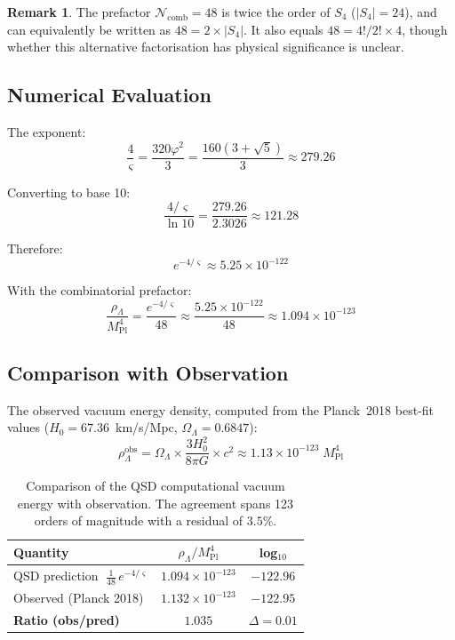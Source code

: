 \documentclass[11pt,a4paper]{article}
\theoremstyle{definition}
\newtheorem{remark}[theorem]{Remark}
\newcommand{\gs}{\varsigma}                %
\newcommand{\Mpl}{M_{\text{Pl}}}
\newcommand{\rhoL}{\rho_{\Lambda}}
\newcommand{\Ncomb}{\mathcal{N}_{\text{comb}}}
\begin{document}
\begin{remark}
The prefactor $\Ncomb = 48$ is twice the order of $S_4$ ($|S_4| = 24$), and can equivalently be written as $48 = 2 \times |S_4|$. It also equals $48 = 4!/2! \times 4$, though whether this alternative factorisation has physical significance is unclear.
\end{remark}

\subsection{Numerical Evaluation}

The exponent:
\begin{equation}
    \frac{4}{\gs} = \frac{320\varphi^2}{3} = \frac{160(3+\sqrt{5})}{3} \approx 279.26
\end{equation}

Converting to base 10:
\begin{equation}
    \frac{4/\gs}{\ln 10} = \frac{279.26}{2.3026} \approx 121.28
\end{equation}

Therefore:
\begin{equation}
    e^{-4/\gs} \approx 5.25 \times 10^{-122}
\end{equation}

With the combinatorial prefactor:
\begin{equation}
    \frac{\rhoL}{\Mpl^4} = \frac{e^{-4/\gs}}{48} \approx \frac{5.25 \times 10^{-122}}{48} \approx 1.094 \times 10^{-123}
\end{equation}

\subsection{Comparison with Observation}

The observed vacuum energy density, computed from the Planck~2018 best-fit values ($H_0 = 67.36$~km/s/Mpc, $\Omega_\Lambda = 0.6847$):
\begin{equation}
    \rhoL^{\text{obs}} = \Omega_\Lambda \times \frac{3 H_0^2}{8\pi G} \times c^2 \approx 1.13 \times 10^{-123}\;\Mpl^4
\end{equation}

\begin{table}[h]
\centering
\begin{tabular}{lcc}
\toprule
\textbf{Quantity} & \textbf{$\rhoL / \Mpl^4$} & \textbf{log$_{10}$} \\
\midrule
QSD prediction $\;\frac{1}{48}\,e^{-4/\gs}$ & $1.094 \times 10^{-123}$ & $-122.96$ \\[3pt]
Observed (Planck 2018)  & $1.132 \times 10^{-123}$ & $-122.95$ \\
\midrule
\textbf{Ratio (obs/pred)} & $\mathbf{1.035}$ & $\Delta = 0.01$ \\
\bottomrule
\end{tabular}
\caption{Comparison of the QSD computational vacuum energy with observation. The agreement spans 123 orders of magnitude with a residual of $3.5\%$.}
\end{table}
\end{document}
